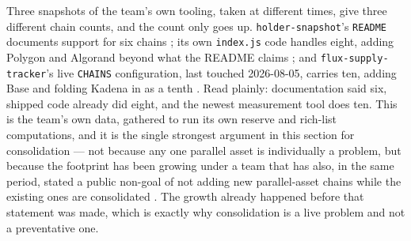 Three snapshots of the team's own tooling, taken at different times, give three different chain
counts, and the count only goes up. \texttt{holder-\allowbreak{}snapshot}'s \texttt{README} documents support
for six chains ; its own \texttt{index.js} code
handles eight, adding Polygon and Algorand beyond what the README claims
\shipped {}; and \texttt{flux-\allowbreak{}supply-\allowbreak{}tracker}'s live
\texttt{CHAINS} configuration, last touched 2026-08-05, carries ten, adding Base and folding Kadena
in as a tenth \shipped {}. Read plainly: documentation
said six, shipped code already did eight, and the newest measurement tool does ten. This is the
team's own data, gathered to run its own reserve and rich-list computations, and it is the single
strongest argument in this section for consolidation — not because any one parallel asset is
individually a problem, but because the footprint has been growing under a team that has also, in
the same period, stated a public non-goal of not adding new parallel-asset chains while the existing
ones are consolidated . The growth already happened before
that statement was made, which is exactly why consolidation is a live problem and not a preventative
one.

